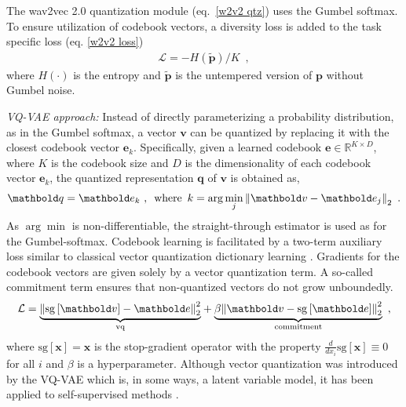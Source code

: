 The wav2vec 2.0 quantization module (eq.~\ref{w2v2 qtz}) uses the Gumbel softmax. To ensure utilization of codebook vectors, a diversity loss is added to the task specific loss (eq. \ref{w2v2 loss})
%
\begin{align}
    \mathcal{L} =  - H(\widetilde{\mathbf{p}}) / K \enspace,
\end{align}
\noindent where $H(\cdot)$ is the entropy and $\widetilde{\mathbf{p}}$ is the untempered version of $\mathbf{p}$ without Gumbel noise.

\textit{VQ-VAE approach:} Instead of directly parameterizing a probability distribution, as in the Gumbel softmax, a vector $\mathbf{v}$ can be quantized by replacing it with the closest codebook vector $\mathbf{e}_k$. Specifically, given a learned codebook $\mathbf{e}\in\mathbb{R}^{K\times D}$, where $K$ is the codebook size and $D$ is the dimensionality of each codebook vector $\mathbf{e}_k$, the quantized representation $\mathbf{q}$ of $\mathbf{v}$ is obtained as,
\begin{align}
    \mathbf{q} = \mathbf{e}_k \ , \enspace \text{where} \enspace k=\arg\min_j \norm{\mathbf{v} - \mathbf{e}_j}_2 \enspace .
\end{align}
As $\arg\min$ is non-differentiable, the straight-through estimator is used as for the Gumbel-softmax. 
%
%
Codebook learning is facilitated by a two-term auxiliary loss similar to classical vector quantization dictionary learning \cite{burton_generalization_1983, soong_vector_1985}. Gradients for the codebook vectors are given solely by a vector quantization term. A so-called commitment term ensures that non-quantized vectors do not grow unboundedly.
\begin{align}
    \mathcal{L} = \underset{\text{vq}}{\underbrace{\norm{\text{sg}\left[\mathbf{v}\right] - \mathbf{e}}_2^2}} + \underset{\text{commitment}}{\underbrace{\beta\norm{\mathbf{v} - \text{sg}\left[\mathbf{e}\right]}_2^2}} \enspace , \label{eq: vector quantization losses}
\end{align}
where $\text{sg}[\mathbf{x}] = \mathbf{x}$ is the stop-gradient operator with the property $\frac{d}{dx_i}\text{sg}[\mathbf{x}] \equiv 0$ for all $i$ and $\beta$ is a hyperparameter. Although vector quantization was introduced by the VQ-VAE which is, in some ways, a latent variable model, it has been applied to self-supervised methods \cite{niekerk_vector_2020, baevski2019vq}.

